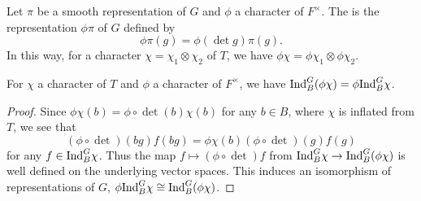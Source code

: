 \begin{defn}\label{defn:twist}
    Let $\pi$ be a smooth representation of $G$ and $\phi$ a character of $F^\times$. The  is the representation $\phi\pi$ of $G$ defined by 
    $$\phi \pi(g) = \phi (\det g)\pi(g).$$
    In this way, for a character $\chi=\chi_1 \otimes \chi_2$ of $T$, we have $\phi\chi = \phi\chi_1 \otimes \phi\chi_2$. 
\end{defn}

\begin{lemma}
    For $\chi$ a character of $T$ and $\phi$ a character of $F^\times$, we have $\mathrm{Ind}_B^G(\phi\chi) = \phi\mathrm{Ind}_B^G \chi$.
\end{lemma}
\begin{proof}
    Since $\phi\chi(b) = \phi \circ \det(b) \chi(b)$ for any $b \in B$, where $\chi$ is inflated from $T$, we see that 
    $$(\phi \circ \det)(bg)f(bg) = \phi\chi(b)(\phi \circ \det)(g)f(g)$$ for any $f \in \mathrm{Ind}_B^G \chi$. Thus the map $f \mapsto (\phi \circ \det)f$ from $\mathrm{Ind}_B^G \chi \to \mathrm{Ind}_B^G(\phi\chi)$ is well defined on the underlying vector spaces. This induces an isomorphism of representations of $G$, $\phi\mathrm{Ind}_B^G \chi \cong \mathrm{Ind}_B^G(\phi\chi)$.
\end{proof}

